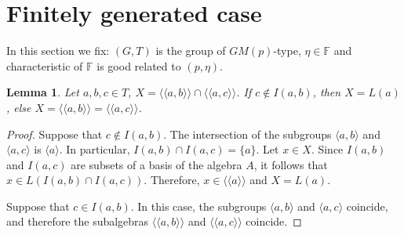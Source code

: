 \documentclass[12pt]{article}
\newcommand\F{\mathbb{F}}
\newcommand\la{\langle}
\newcommand\ra{\rangle}
\newcommand\lla{\la\!\la}
\newcommand\rra{\ra\!\ra}
\newtheorem{lem}{Lemma}
\newtheorem{rem}{Remark}
\begin{document}
		
		
		
		
		





\section{Finitely generated case}
In this section we fix: $(G,T)$ is the group of $GM(p)$-type, $\eta\in \F$ and characteristic of $\F$ is good related to $(p,\eta)$. 

\begin{lem}\label{inter}
Let $a,b,c\in T$, $X=\lla a,b\rra\cap\lla a,c\rra$. If $c\not \in I(a,b)$, then $X=L(a)$, else $X=\lla a,b\rra=\lla a,c\rra$. 
\end{lem}
\begin{proof}
	Suppose that $c\not \in I(a, b)$. The intersection of the subgroups $\la a, b\ra$ and $\la a, c\ra$ is $\la a \ra$. In particular, $I(a,b)\cap I(a,c)=\{a\}$. Let $x\in X$. Since $I(a,b)$ and $I(a,c)$ are subsets of a basis of the algebra $A$, it follows that $x\in L(I(a,b)\cap I(a,c))$. Therefore, $x\in \lla a\rra$ and $X=L(a)$.
	
	Suppose that $c \in I(a, b)$. In this case, the subgroups $\la a, b\ra$ and $\la a, c\ra$ coincide, and therefore the subalgebras $\lla a,b\rra$ and $\lla a,c\rra$ coincide.  
\end{proof}
\end{document}
